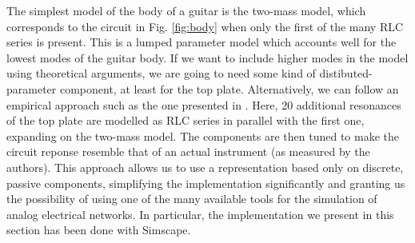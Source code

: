 \documentclass[a4paper]{article}
\begin{document}
The simplest model of the body of a guitar is the two-mass model, which corresponds to the circuit in Fig. \ref{fig:body} when only the first of the many RLC series is present. This is a lumped parameter model which accounts well for the lowest modes of the guitar body. If we want to include higher modes in the model using theoretical arguments, we are going to need some kind of distibuted-parameter component, at least for the top plate. Alternatively, we can follow an empirical approach such as the one presented in \cite{leefrench}. Here, 20 additional resonances of the top plate are modelled as RLC series in parallel with the first one, expanding on the two-mass model. The components are then tuned to make the circuit reponse resemble that of an actual instrument (as measured by the authors). This approach allows us to use a representation based only on discrete, passive components, simplifying the implementation significantly and granting us the possibility of using one of the many available tools for the simulation of analog electrical networks. In particular, the implementation we present in this section has been done with Simscape.



\printbibliography
\end{document}
